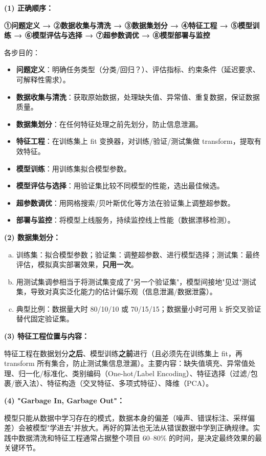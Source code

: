 \documentclass[a4paper,11pt]{ctexart}
\begin{document}
\begin{solutionbox}[参考答案与详细解析]
    \textbf{(1) 正确顺序：}

    \textbf{①问题定义 → ②数据收集与清洗 → ③数据集划分 → ④特征工程 → ⑤模型训练 → ⑥模型评估与选择 → ⑦超参数调优 → ⑧模型部署与监控}

    各步目的：
    \begin{itemize}
        \item \textbf{问题定义}：明确任务类型（分类/回归？）、评估指标、约束条件（延迟要求、可解释性需求）。
        \item \textbf{数据收集与清洗}：获取原始数据，处理缺失值、异常值、重复数据，保证数据质量。
        \item \textbf{数据集划分}：在任何特征处理之前先划分，防止信息泄漏。
        \item \textbf{特征工程}：在训练集上 fit 变换器，对训练/验证/测试集做 transform，提取有效特征。
        \item \textbf{模型训练}：用训练集拟合模型参数。
        \item \textbf{模型评估与选择}：用验证集比较不同模型的性能，选出最佳候选。
        \item \textbf{超参数调优}：用网格搜索/贝叶斯优化等方法在验证集上调整超参数。
        \item \textbf{部署与监控}：将模型上线服务，持续监控线上性能（数据漂移检测）。
    \end{itemize}

    \textbf{(2) 数据集划分：}
    \begin{enumerate}[a.]
        \item 训练集：拟合模型参数；验证集：调整超参数、进行模型选择；测试集：最终评估，模拟真实部署效果，\textbf{只用一次}。
        \item 用测试集调参相当于将测试集变成了"另一个验证集"，模型间接地"见过"测试集，导致对真实泛化能力的估计偏乐观（信息泄漏/数据泄露）。
        \item 典型比例：数据量大时 80/10/10 或 70/15/15；数据量小时可用 k 折交叉验证替代固定验证集。
    \end{enumerate}

    \textbf{(3) 特征工程位置与内容：}

    特征工程在数据划分\textbf{之后}、模型训练\textbf{之前}进行（且必须先在训练集上 fit，再 transform 所有集合，防止测试集信息泄漏）。主要内容：缺失值填充、异常值处理、归一化/标准化、类别编码（One-hot/Label Encoding）、特征选择（过滤/包裹/嵌入法）、特征构造（交叉特征、多项式特征）、降维（PCA）。

    \textbf{(4) "Garbage In, Garbage Out"：}

    模型只能从数据中学习存在的模式，数据本身的偏差（噪声、错误标注、采样偏差）会被模型"学进去"并放大。再好的算法也无法从错误数据中学到正确规律。实践中数据清洗和特征工程通常占据整个项目 60--80\% 的时间，是决定最终效果的最关键环节。
\end{solutionbox}
\end{document}
